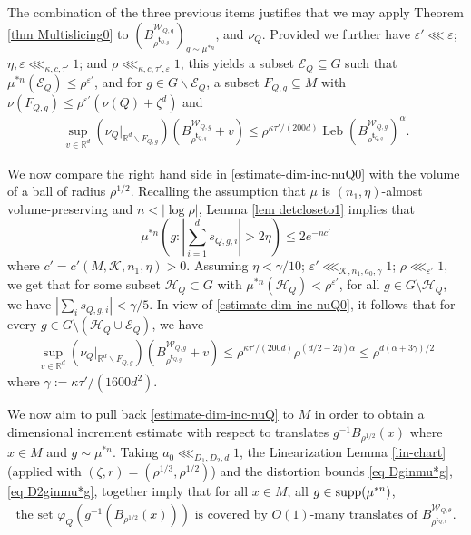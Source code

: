 \documentclass[11pt, leqno, fleqn]{amsart}
\def\cW{\mathcal W}
\def\eps{\varepsilon}
\newcommand{\margem}[1]{\marginpar{{\scriptsize {#1}}}}
\def\cH{          \mathcal H}
\def\cE{          \mathcal E}
\def\clo{   \color{orange}}
\def\bt{        \mathbf{t}}
\def \R{{\mathbb R}}
\DeclareMathOperator{\leb}{Leb}
\newcommand{\cK}{{\mathcal K}}
\theoremstyle{definition}
\theoremstyle{definition}
\def\supp{{\rm supp}}
\begin{document}
\bigskip
The combination of the three previous items justifies that we may apply Theorem \ref{thm Multislicing0} to $(B^{  \cW_{Q, g}}_{\rho^{\bt_{Q, g}}})_{g\sim \mu^{*n}}$, and $ \nu_{Q}$.
Provided we further have $\eps' \lll \eps$;  $\eta, \eps \lll_{\kappa, c, \tau'}1$; and $\rho\lll_{\kappa, c, \tau', \eps}1$, this yields a subset $\cE_{Q}\subseteq G$ such that $\mu^{*n}(\cE_{Q})\leq \rho^{\eps'}$, and for $g\in G\smallsetminus \cE_{Q}$, a subset  $F_{Q,g}\subseteq M$ with $\nu(F_{Q,g})\leq \rho^{\eps'}(\nu(Q)+\zeta^d)$ and  
		\begin{align} \label{estimate-dim-inc-nuQ0}
		\sup_{v \in \R^d}(\nu_{Q}|_{\R^d \smallsetminus  F_{Q,g}} )\left( B^{\cW_{Q, g}}_{\rho^{\bt_{Q, g} }} + v \right) \leq \rho^{\kappa \tau'/( 200 d) }   \leb \left(B^{\cW_{Q, g}}_{\rho^{\bt_{Q, g}}}\right)^{\alpha}. 
		\end{align}

		
We now  compare the right hand side in \eqref{estimate-dim-inc-nuQ0} with the volume of a ball of radius $\rho^{1/2}$. Recalling the assumption that $\mu$ is $(n_{1},\eta)$-almost volume-preserving and $n < | \log \rho |$, Lemma \ref{lem detcloseto1} implies that 
$$\mu^{*n}\left(g : |\sum_{i=1}^d s_{Q,g,i}| >2\eta \right)\leq 2e^{-nc'}$$
where $c'=c'(M, \cK, n_{1}, \eta)>0$. Assuming $\eta<\gamma/10$; $\eps' \lll_{\cK, n_{1},a_{0}, \gamma}1$; $\rho\lll_{\eps'}1$, we  get that
 for some  subset $\cH_{Q} \subset G$ with $\mu^{*n}(\cH_Q) < \rho^{\eps'}$, for  all $g \in G \setminus \cH_Q$, we have  
		 $|   \sum_{i} s_{Q,g,i}  |  < \gamma/5$.
 In view of \eqref{estimate-dim-inc-nuQ0}, it follows that for every $g \in G \setminus (\cH_Q \cup \cE_Q)$, we have  
		\begin{align} \label{estimate-dim-inc-nuQ}
	\sup_{v \in \R^d}(\nu_{Q}|_{\R^d \smallsetminus  F_{Q,g}} )\left( B^{\cW_{Q, g}}_{\rho^{\bt_{Q, g} }} + v \right) \leq  \rho^{\kappa \tau'/( 200 d) }  \rho^{(d/2 - 2 \eta) \alpha}  \leq \rho^{d(\alpha + 3 \gamma) / 2}
\end{align}
 where $\gamma :=  \kappa \tau' / (1600 d^2) $.   
		  
		\bigskip
		
		
		
     	 
     	We now aim to pull back  \eqref{estimate-dim-inc-nuQ} to $M$ in order to  obtain a dimensional increment estimate with respect to translates $g^{-1}B_{\rho^{1/2}}(x)$ where $x\in M$ and $g\sim \mu^{*n}$. 
 Taking $a_{0}\lll_{D_{1},D_{2}, d}1$,   the Linearization Lemma \ref{lin-chart} (applied with $(\zeta, r)=(\rho^{1/3}, \rho^{1/2})$)  and the distortion  bounds \eqref{eq Dginmu*g}, \eqref{eq D2ginmu*g},  together  imply that for all $x \in M$, all $g\in \supp ( \mu^{*n} )$,
     \begin{align} \label{eq coveringmultiplicity}
     \text{the set $\varphi_Q  (g^{-1}(B_{\rho^{1/2}}(x)))$ is covered by $O(1)$-many  translates of   $B^{\cW_{Q, \theta}}_{\rho^{\bt_{Q, \theta}}}$.}
\end{align}
	     	
\end{document}
